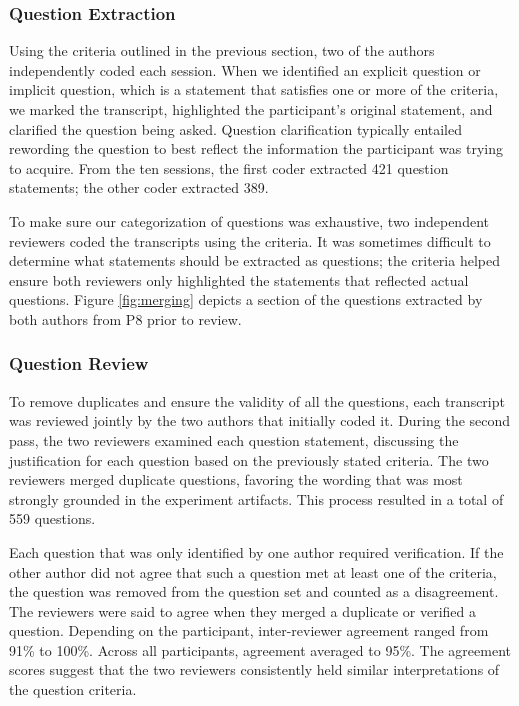 \documentclass{acm_proc_article-sp}
\begin{document}
\subsubsection{Question Extraction}
Using the criteria outlined in the previous section, two of the authors independently coded each session. 
When we identified an explicit question or implicit question, which is a statement that satisfies one or more of the criteria, we marked the transcript, highlighted the participant's original statement, and clarified the question being asked.
Question clarification typically entailed rewording the question to best reflect the information the participant was trying to acquire.
From the ten sessions, the first coder extracted 421 question statements; the other coder extracted 389. 

To make sure our categorization of questions was exhaustive, two independent reviewers coded the transcripts using the criteria.
It was sometimes difficult to determine what statements should be extracted as questions; the criteria helped ensure both reviewers only highlighted the statements that reflected actual questions. 
Figure \ref{fig:merging} depicts a section of the questions extracted by both authors from P8 prior to review.



\subsubsection{Question Review}
To remove duplicates and ensure the validity of all the questions, each transcript was reviewed jointly by the two authors that initially coded it.
During the second pass, the two reviewers examined each question statement, discussing the justification for each question based on the previously stated criteria.
The two reviewers merged duplicate questions, favoring the wording that was most strongly grounded in the experiment artifacts.
This process resulted in a total of 559 questions.

Each question that was only identified by one author required verification.
If the other author did not agree that such a question met at least one of the criteria, the question was removed from the question set and counted as a disagreement.
The reviewers were said to agree when they merged a duplicate or verified a question. Depending on the participant, inter-reviewer agreement ranged from 91\% to 100\%. Across all participants, agreement averaged to 95\%.
The agreement scores suggest that the two reviewers consistently held similar interpretations of the question criteria.
\end{document}
